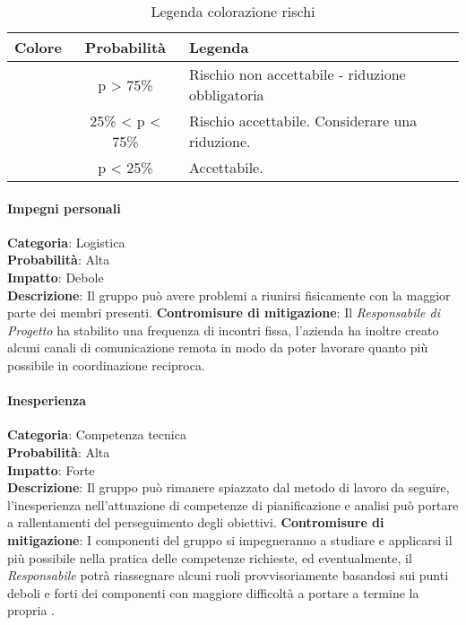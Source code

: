 \documentclass{scalatekids-article}
\begin{document}
\begin{table}[H]
  \centering
  \caption{Legenda colorazione rischi}
  \begin{tabular}{|c|c|l|}
    \hline \bf Colore & \bf Probabilità & \bf Legenda \\
    \hline \cellcolor{red! 50} & p > 75\% & Rischio non accettabile - riduzione obbligatoria \\
    \hline \cellcolor{yellow! 50} & 25\% < p < 75\% & Rischio accettabile. Considerare una riduzione. \\
    \hline \cellcolor{green! 50} & p < 25\% & Accettabile. \\
    \hline
  \end{tabular}
\end{table}
\paragraph{Impegni personali}
\textbf{Categoria}: Logistica\\
\textbf{Probabilità}: Alta\\
\textbf{Impatto}: Debole\\
\textbf{Descrizione}: Il gruppo può avere problemi a riunirsi fisicamente con la maggior parte dei membri presenti.
\textbf{Contromisure di mitigazione}: Il \textit{Responsabile di Progetto} ha stabilito una frequenza di incontri fissa,
l'azienda ha inoltre creato alcuni canali di comunicazione remota in modo da poter lavorare quanto più possibile in
coordinazione reciproca.
\paragraph{Inesperienza}
\textbf{Categoria}: Competenza tecnica\\
\textbf{Probabilità}: Alta\\
\textbf{Impatto}: Forte\\
\textbf{Descrizione}: Il gruppo può rimanere spiazzato dal metodo di lavoro da seguire, l'inesperienza nell'attuazione
di competenze di pianificazione e analisi può portare a rallentamenti del perseguimento degli obiettivi.
\textbf{Contromisure di mitigazione}: I componenti del gruppo si impegneranno a studiare e applicarsi il più possibile
nella pratica delle competenze richieste, ed eventualmente, il \textit{Responsabile} potrà riassegnare alcuni ruoli provvisoriamente
basandosi sui punti deboli e forti dei componenti con maggiore difficoltà a portare a termine la propria .
\end{document}
